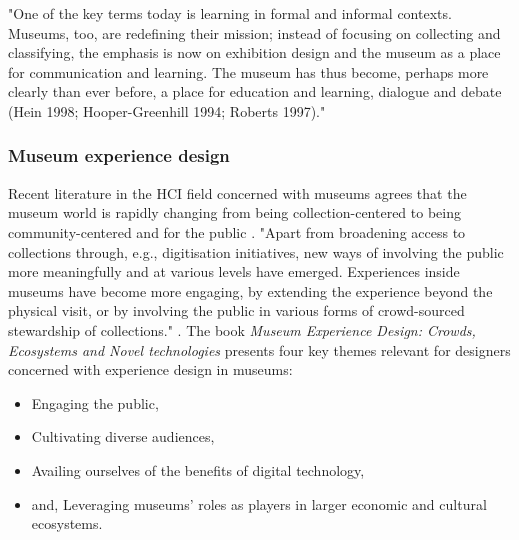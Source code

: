 \par
"One of the key terms today is learning in formal and informal contexts. Museums, too, are redefining their mission; instead of focusing on collecting and classifying, the emphasis is now on exhibition design and the museum as a place for communication and learning. The museum has thus become, perhaps more clearly than ever before, a place for education and learning, dialogue and debate (Hein 1998; Hooper-Greenhill 1994; Roberts 1997)." \autocite[p. 8]{insulander_designs_2009}


\subsubsection{Museum experience design}
Recent literature in the HCI field concerned with museums agrees that the museum world is rapidly changing from being collection-centered to being community-centered and for the public \autocite[p. 1]{vermeeren_museum_2018}. "Apart from broadening access to collections through, e.g., digitisation initiatives, new ways of involving the public more meaningfully and at various levels have emerged. Experiences inside museums have become more engaging, by extending the experience beyond the physical visit, or by involving the public in various forms of crowd-sourced stewardship of collections." \autocite[p. 1]{vermeeren_museum_2018}. The book \emph{Museum Experience Design: Crowds, Ecosystems and Novel technologies} \autocite{vermeeren_museum_2018} presents four key themes relevant for designers concerned with experience design in museums: 
\begin{itemize}
    \item Engaging the public,
    \item Cultivating diverse audiences,
    \item Availing ourselves of the benefits of digital technology,
    \item and, Leveraging museums’ roles as players in larger economic and cultural ecosystems.
\end{itemize}

